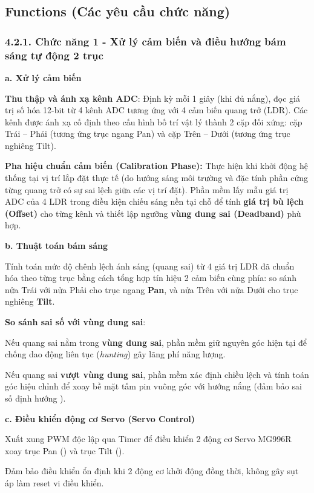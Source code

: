 \documentclass[12pt,a4paper]{report}
\begin{document}
\subsection{Functions (Các yêu cầu chức năng)}

\subsubsection*{4.2.1. Chức năng 1 - Xử lý cảm biến và điều hướng bám sáng tự động 2 trục }

\textbf{a. Xử lý cảm biến }

\textbf{Thu thập và ánh xạ kênh ADC}: Định kỳ mỗi 1 giây (khi đủ nắng), đọc giá trị số hóa 12-bit từ 4 kênh ADC tương ứng với 4 cảm biến quang trở (LDR). Các kênh được ánh xạ cố định theo cấu hình bố trí vật lý thành 2 cặp đối xứng: cặp Trái -- Phải (tương ứng trục ngang Pan) và cặp Trên -- Dưới (tương ứng trục nghiêng Tilt). 

\textbf{Pha hiệu chuẩn cảm biến (Calibration Phase):} Thực hiện khi khởi động hệ thống tại vị trí lắp đặt thực tế (do hướng sáng môi trường và đặc tính phần cứng từng quang trở có sự sai lệch giữa các vị trí đặt). Phần mềm lấy mẫu giá trị ADC của 4 LDR trong điều kiện chiếu sáng nền tại chỗ để tính \textbf{giá trị bù lệch (Offset)} cho từng kênh và thiết lập ngưỡng \textbf{vùng dung sai (Deadband)} phù hợp. 

\textbf{b. Thuật toán bám sáng }

Tính toán mức độ chênh lệch ánh sáng (quang sai) từ 4 giá trị LDR đã chuẩn hóa theo từng trục bằng cách tổng hợp tín hiệu 2 cảm biến cùng phía: so sánh nửa Trái với nửa Phải cho trục ngang \textbf{Pan}, và nửa Trên với nửa Dưới cho trục nghiêng \textbf{Tilt}. 

\textbf{So sánh sai số với vùng dung sai}: 

Nếu quang sai nằm trong \textbf{vùng dung sai}, phần mềm giữ nguyên góc hiện tại để chống dao động liên tục (\textit{hunting}) gây lãng phí năng lượng. 

Nếu quang sai \textbf{vượt vùng dung sai}, phần mềm xác định chiều lệch và tính toán góc hiệu chỉnh để xoay bề mặt tấm pin vuông góc với hướng nắng (đảm bảo sai số định hướng ). 

\textbf{c. Điều khiển động cơ Servo (Servo Control) }

Xuất xung PWM độc lập qua Timer để điều khiển 2 động cơ Servo MG996R xoay trục Pan () và trục Tilt (). 

Đảm bảo điều khiển ổn định khi 2 động cơ khởi động đồng thời, không gây sụt áp làm reset vi điều khiển. 
\end{document}
